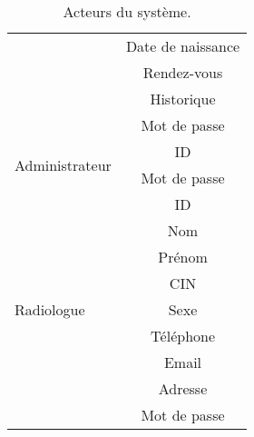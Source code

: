 \begin{table}[h!]
\begin{tabular}{lc}
                                              & Date de naissance              \\
                                              & Rendez-vous                    \\
                                              & Historique                     \\
                                              & Mot de passe                   \\
\multirow{2}{*}{Administrateur}               & ID                             \\
                                              & Mot de passe                   \\
\multirow{9}{*}{Radiologue}                   & ID                             \\
                                              & Nom                            \\
                                              & Prénom                         \\
                                              & CIN                            \\
                                              & Sexe                           \\
                                              & Téléphone                      \\
                                              & Email                          \\
                                              & Adresse                        \\
                                              & Mot de passe                  
\end{tabular}

\caption{Acteurs du système.}
\label{table:acteurs}

\end{table}






